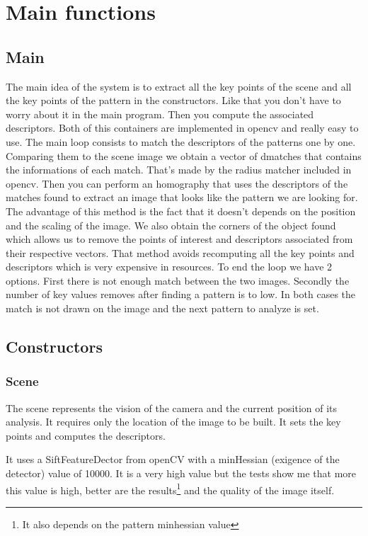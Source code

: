\documentclass[english,a4paper,11pt]{report}
\begin{document}
	\section{Main functions}
	
	\subsection{Main}
		 The main idea of the system is to extract all the key points of the scene and all the key points of the pattern in the constructors. Like that you don't have to worry about it in the main program. 
		Then you compute the associated descriptors. Both of this containers are implemented in opencv and really easy to use. 
	The main loop consists to match the descriptors of the patterns one by one. Comparing them to the scene image we obtain a vector of dmatches that contains the informations of each match. That's made by the radius matcher included in opencv. 
	Then you can perform an homography  that uses the descriptors of the matches found to extract an image that looks like the pattern we are looking for. The advantage of this method is the fact that it doesn't depends on the position and the scaling of the image. We also obtain the corners of the object found which allows us to remove the points of interest and descriptors associated from their respective vectors. That method avoids recomputing all the key points and descriptors which is very expensive in resources. 
	To end the loop we have 2 options. First there is not enough match between the two images. Secondly the number of key values removes after finding a pattern is to low. In both cases the match is not drawn on the image and the next pattern to analyze is set.
	\subsection{Constructors}
	\label{constructors}
	\subsubsection{Scene}
	\par The scene represents the vision of the camera and the current position of its analysis. 
	It requires only the location of the image to be built. It sets the key points and computes the descriptors. 
	\par It uses a SiftFeatureDector from openCV with a minHessian (exigence of the detector) value of 10000. It is a very high value but the tests show me that more this value is high, better are the results\footnote{It also depends on the pattern minhessian value} and the quality of the image itself.
\end{document}
